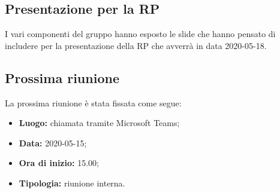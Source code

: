	\subsection{Presentazione per la RP}
	I vari componenti del gruppo hanno esposto le slide che hanno pensato di includere per la presentazione della RP che avverrà in data 2020-05-18.
		
		
	\subsection{Prossima riunione}
		La prossima riunione è stata fissata come segue:
		\begin{itemize}
			\item \textbf{Luogo: } chiamata tramite Microsoft Teams; 
			\item \textbf{Data: } 2020-05-15;
			\item \textbf{Ora di inizio: } 15.00;
			\item \textbf{Tipologia: } riunione interna.
		\end{itemize}
